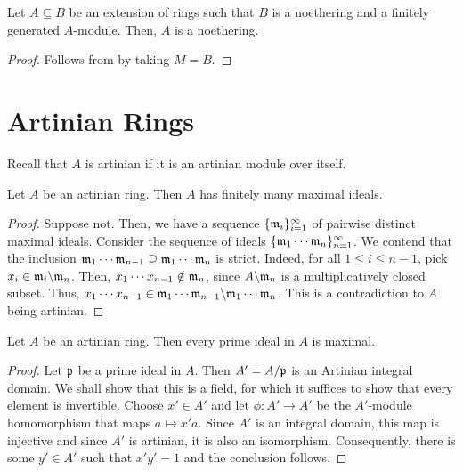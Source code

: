 \begin{theorem}
    Let $A\subseteq B$ be an extension of rings such that $B$ is a noethering and a finitely generated $A$-module. Then, $A$ is a noethering.
\end{theorem}
\begin{proof}
    Follows from  by taking $M = B$.
\end{proof}


\section{Artinian Rings}

Recall that $A$ is artinian if it is an artinian module over itself.

\begin{proposition}
    Let $A$ be an artinian ring. Then $A$ has finitely many maximal ideals.
\end{proposition}
\begin{proof}
    Suppose not. Then, we have a sequence $\{\mathfrak m_i\}_{i = 1}^\infty$ of pairwise distinct maximal ideals. Consider the sequence of ideals $\{\mathfrak m_1\cdots\mathfrak m_n\}_{n = 1}^\infty$. We contend that the inclusion $\mathfrak m_1\cdots\mathfrak m_{n - 1}\supseteq\mathfrak m_1\cdots\mathfrak m_n$ is strict. Indeed, for all $1\le i\le n - 1$, pick $x_i\in\mathfrak m_i\backslash\mathfrak m_n$. Then, $x_1\cdots x_{n - 1}\notin\mathfrak m_n$, since $A\backslash\mathfrak m_n$ is a multiplicatively closed subset. Thus, $x_1\cdots x_{n - 1}\in\mathfrak m_1\cdots\mathfrak m_{n - 1}\backslash\mathfrak m_1\cdots\mathfrak m_n$. This is a contradiction to $A$ being artinian.
\end{proof}

\begin{proposition}
    Let $A$ be an artinian ring. Then every prime ideal in $A$ is maximal.
\end{proposition}
\begin{proof}
    Let $\mathfrak p$ be a prime ideal in $A$. Then $A' = A/\mathfrak p$ is an Artinian integral domain. We shall show that this is a field, for which it suffices to show that every element is invertible. Choose $x'\in A'$ and let $\phi: A'\to A'$ be the $A'$-module homomorphism that maps $a\mapsto x'a$. Since $A'$ is an integral domain, this map is injective and since $A'$ is artinian, it is also an isomorphism. Consequently, there is some $y'\in A'$ such that $x'y' = 1$ and the conclusion follows.
\end{proof}

